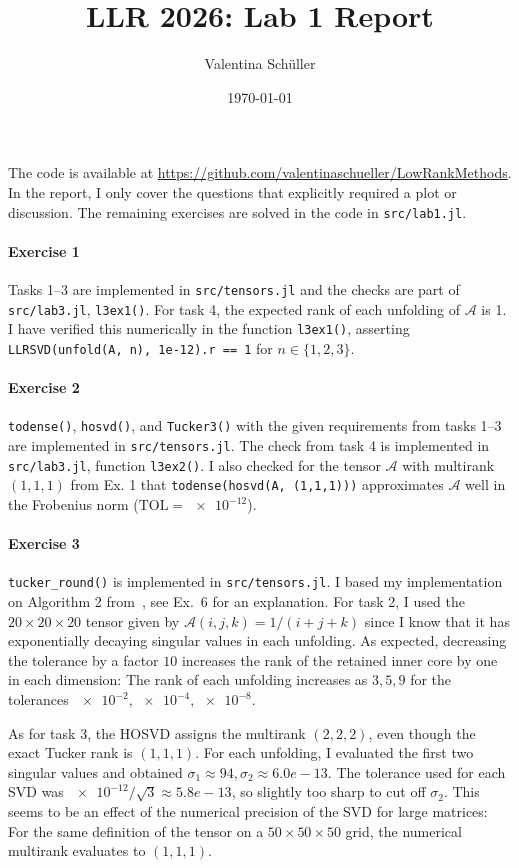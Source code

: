 \documentclass{article}
\title{LLR 2026: Lab 1 Report}
\author{Valentina Schüller}
\date{\today}
\begin{document}
\maketitle

The code is available at
\url{https://github.com/valentinaschueller/LowRankMethods}.
In the report, I only cover the questions that explicitly required a
plot or discussion.
The remaining exercises are solved in the code in \verb|src/lab1.jl|.

\paragraph{Exercise 1}
Tasks 1--3 are implemented in \verb|src/tensors.jl| and the
checks are part of \verb|src/lab3.jl|, \verb|l3ex1()|.
For task 4, the expected rank of each unfolding of \(\mathcal{A}\) is 1.
I have verified this numerically in the function \verb|l3ex1()|, asserting
\verb|LLRSVD(unfold(A, n), 1e-12).r == 1| for \(n\in\{1,2,3\}\).

\paragraph{Exercise 2}
\verb|todense()|, \verb|hosvd()|, and \verb|Tucker3()| with the given
requirements from tasks 1--3 are implemented in \verb|src/tensors.jl|.
The check from task 4 is implemented in \verb|src/lab3.jl|, function
\verb|l3ex2()|.
I also checked for the tensor \(\mathcal{A}\) with multirank
\((1,1,1)\) from Ex. 1 that \verb|todense(hosvd(A, (1,1,1)))|
approximates \(\mathcal{A}\) well in the Frobenius norm
(\(\mathrm{TOL}=\num{e-12}\)).

\paragraph{Exercise 3}
\verb|tucker_round()| is implemented in \verb|src/tensors.jl|.
I based my implementation on Algorithm 2 from~\cite{smith.etal_2026},
see Ex.~6 for an explanation.
For task 2, I used the \(20\times 20\times 20\) tensor given by
\(\mathcal{A}(i,j,k)=1/(i+j+k)\) since I know that it has exponentially decaying
singular values in each unfolding.
As expected, decreasing the tolerance by a factor \(10\) increases
the rank of the retained inner core by one in each dimension:
The rank of each unfolding increases as \(3,5,9\) for the tolerances
\(\num{e-2},\num{e-4},\num{e-8}\).

As for task 3, the HOSVD assigns the multirank \((2,2,2)\), even
though the exact Tucker rank is \((1,1,1)\).
For each unfolding, I evaluated the first two singular values and
obtained \(\sigma_{1}\approx 94, \sigma_2 \approx 6.0e-13\).
The tolerance used for each SVD was \(\num{e-12}/\sqrt{3}\approx
5.8e-13\), so slightly too sharp to cut off \(\sigma_2\).
This seems to be an effect of the numerical precision of the SVD for
large matrices:
For the same definition of the tensor on a \(50\times50\times50\)
grid, the numerical multirank evaluates to \((1,1,1)\).
\end{document}
